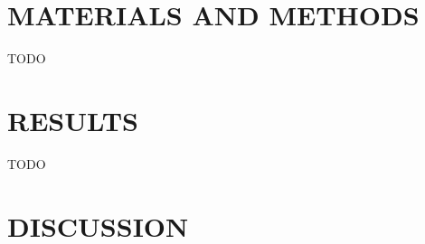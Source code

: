 \documentclass{article}
\begin{document}
%
%
%

\section*{MATERIALS AND METHODS}

TODO

\section*{RESULTS}

TODO

\section*{DISCUSSION}
\end{document}
